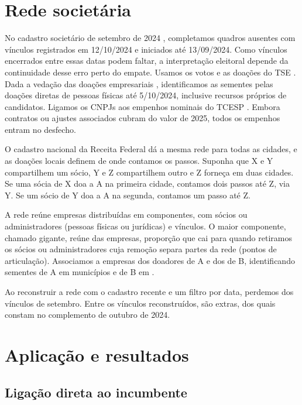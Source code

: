 \documentclass[10pt,a4paper]{article}
\newcounter{quadro}
\begin{document}
\section{Rede societária}
\label{sec:dados}
No cadastro societário de setembro de 2024 \cite{rfb2026}, completamos quadros ausentes com
vínculos registrados em 12/10/2024 e iniciados até 13/09/2024. Como vínculos encerrados entre
essas datas podem faltar, a interpretação eleitoral depende da continuidade desse erro perto do
empate. Usamos os votos e as doações do TSE \cite{tse2026}. Dada a vedação das doações
empresariais \cite{adi4650}, identificamos as sementes pelas doações diretas de pessoas físicas
até 5/10/2024, inclusive recursos próprios de candidatos. Ligamos os CNPJs aos empenhos
nominais do TCESP \cite{tcesp2026}. Embora contratos ou ajustes associados cubram
\taxaVinculacao{} do valor de 2025, todos os empenhos entram no desfecho.

O cadastro nacional da Receita Federal dá a mesma rede para todas as cidades, e as doações
locais definem de onde contamos os passos. Suponha que X e Y compartilhem um sócio, Y e Z
compartilhem outro e Z forneça em duas cidades. Se uma sócia de X doa a A na primeira cidade,
contamos dois passos até Z, via Y. Se um sócio de Y doa a A na segunda, contamos um passo até Z.

A rede reúne \empresasRede{} empresas distribuídas em \componentesRede{} componentes, com
\pessoasRede{} sócios ou administradores (pessoas físicas ou jurídicas) e \vinculosRede{} vínculos.
\perfilRede{}
O maior componente, chamado gigante, reúne \fracGigante{} das empresas, proporção que cai para
\fracGiganteSemArt{} quando retiramos os sócios ou administradores cuja remoção separa partes da
rede (pontos de articulação). Associamos a empresas \taxaCruzamentoA{} dos doadores de A e
\taxaCruzamentoB{} dos de B, identificando sementes de A em \munConexaoA{} municípios e de B em
\munConexaoB{}.

Ao reconstruir a rede com o cadastro recente e um filtro por data, perdemos
\fracVinculosPerdidos{} dos vínculos de setembro. Entre os vínculos reconstruídos,
\fracVinculosExtras{} são extras, dos quais \fracVinculosLacuna{} constam no complemento de
outubro de 2024.

\section{Aplicação e resultados}
\subsection{Ligação direta ao incumbente}
\leituraHUm{}
\end{document}
